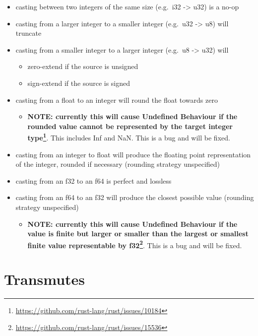 \documentclass[a4paper,]{book}
\renewcommand{\href}[2]{#2\footnote{\url{#1}}}
\providecommand{\tightlist}{%
  \setlength{\itemsep}{0pt}\setlength{\parskip}{0pt}}
\begin{document}
\begin{itemize}
\tightlist
\item
  casting between two integers of the same size (e.g.~i32
  -\textgreater{} u32) is a no-op
\item
  casting from a larger integer to a smaller integer (e.g.~u32
  -\textgreater{} u8) will truncate
\item
  casting from a smaller integer to a larger integer (e.g.~u8
  -\textgreater{} u32) will

  \begin{itemize}
  \tightlist
  \item
    zero-extend if the source is unsigned
  \item
    sign-extend if the source is signed
  \end{itemize}
\item
  casting from a float to an integer will round the float towards zero

  \begin{itemize}
  \tightlist
  \item
    \textbf{\href{https://github.com/rust-lang/rust/issues/10184}{NOTE:
    currently this will cause Undefined Behaviour if the rounded value
    cannot be represented by the target integer type}}. This includes
    Inf and NaN. This is a bug and will be fixed.
  \end{itemize}
\item
  casting from an integer to float will produce the floating point
  representation of the integer, rounded if necessary (rounding strategy
  unspecified)
\item
  casting from an f32 to an f64 is perfect and lossless
\item
  casting from an f64 to an f32 will produce the closest possible value
  (rounding strategy unspecified)

  \begin{itemize}
  \tightlist
  \item
    \textbf{\href{https://github.com/rust-lang/rust/issues/15536}{NOTE:
    currently this will cause Undefined Behaviour if the value is finite
    but larger or smaller than the largest or smallest finite value
    representable by f32}}. This is a bug and will be fixed.
  \end{itemize}
\end{itemize}

\section{Transmutes}\label{sec--transmutes}
\end{document}
